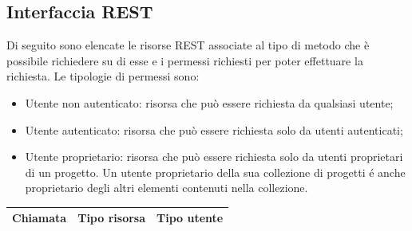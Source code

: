 \subsection{Interfaccia REST}
Di seguito sono elencate le risorse REST associate al tipo di metodo che è possibile richiedere su di esse e i permessi richiesti per poter effettuare la richiesta.
Le tipologie di permessi sono:
\begin{itemize}
	\item Utente non autenticato: risorsa che può essere richiesta da qualsiasi utente;
	\item Utente autenticato: risorsa che può essere richiesta solo da utenti autenticati;
	\item Utente proprietario: risorsa che può essere richiesta solo da utenti proprietari di un progetto. Un utente proprietario della sua collezione di progetti é anche proprietario degli altri elementi contenuti nella collezione.
\end{itemize}

\begin{table}[h]
	\begin{tabular}{|p{}|p{}|p{}|}
		\toprule
		
		\textbf{Chiamata} & \textbf{Tipo risorsa}  & \textbf{Tipo utente} \\
		\bottomrule
	\end{tabular}\\	
\end{table}

